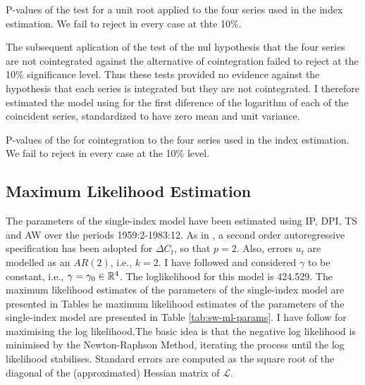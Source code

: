 	\begin{table}[h!]
		\centering\small
		\captionsetup{width=0.6\textwidth, font=small}
		\caption{P-values of the test \protect{} for a unit root applied to the four series used in the index estimation. We fail to reject in every case at thte 10\%.}\label{tab:df_pvalues}
		\vspace{0cm}
		
	\end{table}
 
	The subsequent aplication of the  test of the nul hypothesis that the four series are not cointegrated against the alternative of cointegration failed to reject at the 10\% significance level. Thus these tests provided no evidence against the hypothesis that each series is integrated but they are not cointegrated. I therefore estimated the model using for the first diference of the logarithm of each of the coincident series, standardized to have zero mean and unit variance.

	\begin{table}[h!]
		\centering\small
		\captionsetup{width=0.6\textwidth, font=small}
		\caption{P-values of the \protect\cite{engle1987co} for cointegration to the four series used in the index estimation. We fail to reject in every case at the 10\% level.}
		
	\end{table}

\subsection{Maximum Likelihood Estimation}

The parameters of the single-index model have been estimated using IP, DPI, TS and AW over the periods 1959:2-1983:12. As in , a second order autoregressive  specification  has been adopted for $\Delta C_t$, so that $p=2$. Also, errors $u_t$ are modelled as an $AR(2)$, i.e., $k=2$. I have followed  and considered $\gamma$ to be constant, i.e., $\gamma = \gamma_0\in\mathbb{R}^4$. The loglikelihood for this model is 424.529. The maximum likelihood estimates of the parameters of the single-index model are presented in Tables  he maximum likelihood estimates of the parameters of the single-index model are presented in Table \ref{tab:sw-ml-params}. I have follow  for maximising the log likelihood.The basic idea is that the negative log likelihood is minimised by the Newton-Raphson Method, iterating the process until the log likelihood stabilises. Standard errors are computed as the square root of the diagonal of the (approximated) Hessian matrix of $\mathcal{L}$.


